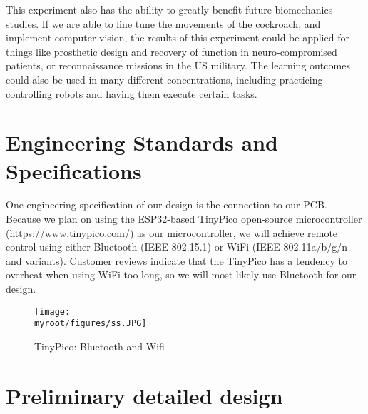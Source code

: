 \documentclass[twocolumn,10pt]{IEEEtran}
\newcommand{\myroot}{.}
\begin{document}
This experiment also has the ability to greatly benefit future  biomechanics studies. If we are able to fine tune the movements of the cockroach, and implement computer vision, the results of this experiment could be applied for things like prosthetic design and recovery of function in neuro-compromised patients, or reconnaissance missions in the US military. The learning outcomes could also be used in many different concentrations, including practicing controlling robots and having them execute certain tasks. 

\section{Engineering Standards and Specifications}
One engineering specification of our design is the connection to our PCB. Because we plan on using the ESP32-based TinyPico open-source microcontroller (\url{https://www.tinypico.com/}) as our microcontroller, we will achieve remote control using either Bluetooth (IEEE 802.15.1) or WiFi (IEEE 802.11a/b/g/n and variants). Customer reviews indicate that the TinyPico has a tendency to overheat when using WiFi too long, so we will most likely use Bluetooth for our design.
\begin{figure}[ht!]
\centering
\texttt{[image: \\myroot/figures/ss.JPG]}
\caption{TinyPico: Bluetooth and Wifi}
\label{fig:ss}
\end{figure}




\section{Preliminary detailed design}
\end{document}

